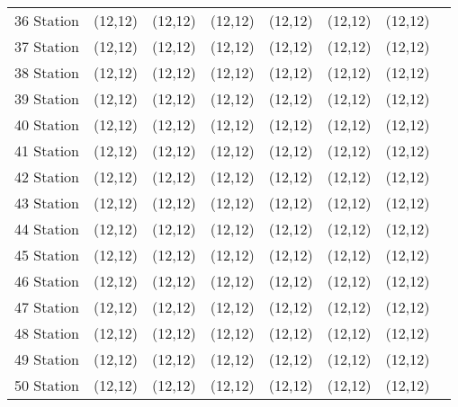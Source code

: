 \documentclass{article}
\begin{document}
\begin{multicols*}{2}
\begin {minipage}{\linewidth}
\begin{supertabular}{l*{6}{>{\centering\arraybackslash}p{1em}}c@{}}
		36 Station  & \framebox(12,12){} & \framebox(12,12){} & \framebox(12,12){} & \framebox(12,12){} & \framebox(12,12){} & \framebox(12,12){} &\\
		37 Station  & \framebox(12,12){} & \framebox(12,12){} & \framebox(12,12){} & \framebox(12,12){} & \framebox(12,12){} & \framebox(12,12){} &\\
		38 Station  & \framebox(12,12){} & \framebox(12,12){} & \framebox(12,12){} & \framebox(12,12){} & \framebox(12,12){} & \framebox(12,12){} &\\
		39 Station  & \framebox(12,12){} & \framebox(12,12){} & \framebox(12,12){} & \framebox(12,12){} & \framebox(12,12){} & \framebox(12,12){} &\\
		40 Station  & \framebox(12,12){} & \framebox(12,12){} & \framebox(12,12){} & \framebox(12,12){} & \framebox(12,12){} & \framebox(12,12){} &\\
		41 Station  & \framebox(12,12){} & \framebox(12,12){} & \framebox(12,12){} & \framebox(12,12){} & \framebox(12,12){} & \framebox(12,12){} &\\
		42 Station  & \framebox(12,12){} & \framebox(12,12){} & \framebox(12,12){} & \framebox(12,12){} & \framebox(12,12){} & \framebox(12,12){} &\\
		43 Station  & \framebox(12,12){} & \framebox(12,12){} & \framebox(12,12){} & \framebox(12,12){} & \framebox(12,12){} & \framebox(12,12){} &\\
		44 Station  & \framebox(12,12){} & \framebox(12,12){} & \framebox(12,12){} & \framebox(12,12){} & \framebox(12,12){} & \framebox(12,12){} &\\
		45 Station  & \framebox(12,12){} & \framebox(12,12){} & \framebox(12,12){} & \framebox(12,12){} & \framebox(12,12){} & \framebox(12,12){} &\\
		46 Station  & \framebox(12,12){} & \framebox(12,12){} & \framebox(12,12){} & \framebox(12,12){} & \framebox(12,12){} & \framebox(12,12){} &\\
		47 Station  & \framebox(12,12){} & \framebox(12,12){} & \framebox(12,12){} & \framebox(12,12){} & \framebox(12,12){} & \framebox(12,12){} &\\
		48 Station  & \framebox(12,12){} & \framebox(12,12){} & \framebox(12,12){} & \framebox(12,12){} & \framebox(12,12){} & \framebox(12,12){} &\\
		49 Station  & \framebox(12,12){} & \framebox(12,12){} & \framebox(12,12){} & \framebox(12,12){} & \framebox(12,12){} & \framebox(12,12){} &\\
		50 Station  & \framebox(12,12){} & \framebox(12,12){} & \framebox(12,12){} & \framebox(12,12){} & \framebox(12,12){} & \framebox(12,12){} &\\

\end{supertabular}
\end{minipage}
\end{multicols*}
\end{document}
